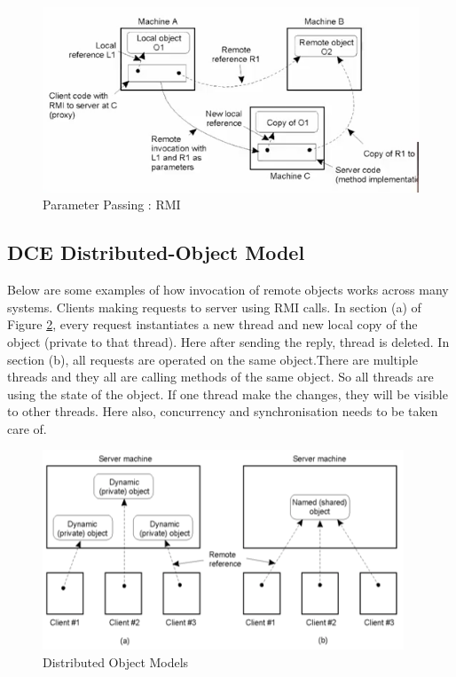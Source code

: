 \documentclass[twoside]{article}
\begin{document}
\begin{figure}[h]
\begin{center}
\includegraphics[scale=0.6]{images/param_passing}
\caption{Parameter Passing : RMI}
\label{passing_param}
\end{center}
\end{figure}

\subsection{DCE Distributed-Object Model}

Below are some examples of how invocation of remote objects works across many systems. Clients making requests to server using RMI calls. In section (a) of Figure \ref{Distributed}, every request instantiates a new thread and new local copy of the object (private to that thread). Here after sending the reply, thread is deleted. In section (b), all requests are operated on the same object.There are multiple threads and they all are calling methods of the same object. So all threads are using the state of the object. If one thread make the changes, they will be visible to other threads. Here also, concurrency and synchronisation needs to be taken care of.
\begin{figure}[h]
\begin{center}
\includegraphics[scale=0.6]{images/DCE}
\caption{Distributed Object Models}
\label{Distributed}
\end{center}
\end{figure}
\end{document}
